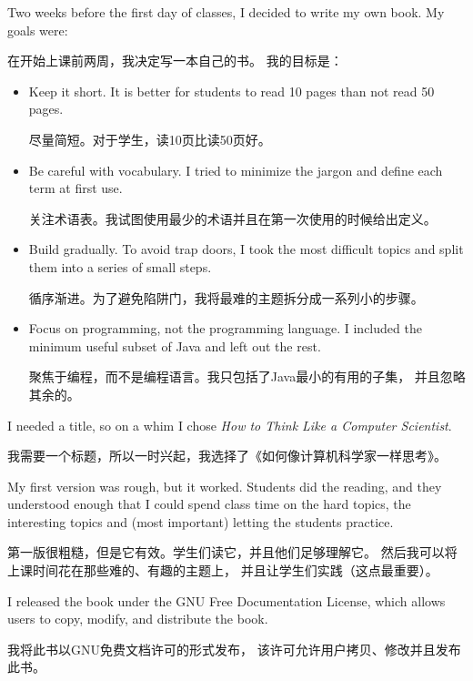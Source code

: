\documentclass[10pt]{book}
\begin{document}
\begin{CJK}{UTF8}{gbsn}
Two weeks before the first day of classes, I decided to write my
own book.  
My goals were:

在开始上课前两周，我决定写一本自己的书。
我的目标是：

\begin{itemize}

\item Keep it short.  It is better for students to read 10 pages
than not read 50 pages.

尽量简短。对于学生，读10页比读50页好。

\item Be careful with vocabulary.  I tried to minimize the jargon
and define each term at first use.

关注术语表。我试图使用最少的术语并且在第一次使用的时候给出定义。

\item Build gradually. To avoid trap doors, I took the most difficult
topics and split them into a series of small steps. 

循序渐进。为了避免陷阱门，我将最难的主题拆分成一系列小的步骤。

\item Focus on programming, not the programming language.  I included
the minimum useful subset of Java and left out the rest.

聚焦于编程，而不是编程语言。我只包括了Java最小的有用的子集，
并且忽略其余的。

\end{itemize}

I needed a title, so on a whim I chose {\em How to Think Like
a Computer Scientist}.

我需要一个标题，所以一时兴起，我选择了《如何像计算机科学家一样思考》。

My first version was rough, but it worked.  Students did the reading,
and they understood enough that I could spend class time on the hard
topics, the interesting topics and (most important) letting the
students practice.

第一版很粗糙，但是它有效。学生们读它，并且他们足够理解它。
然后我可以将上课时间花在那些难的、有趣的主题上，
并且让学生们实践（这点最重要）。

I released the book under the GNU Free Documentation License,
which allows users to copy, modify, and distribute the book.

我将此书以GNU免费文档许可的形式发布，
该许可允许用户拷贝、修改并且发布此书。


\end{CJK}
\end{document}
